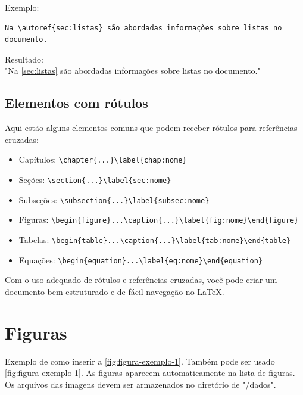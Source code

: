 Exemplo:
\begin{verbatim}
Na \autoref{sec:listas} são abordadas informações sobre listas no documento.
\end{verbatim}

Resultado: \\
"Na \autoref{sec:listas} são abordadas informações sobre listas no documento."

\subsection{Elementos com rótulos}
Aqui estão alguns elementos comuns que podem receber rótulos para referências cruzadas:

\begin{itemize}
\item Capítulos: \texttt{\textbackslash chapter\{...\}\textbackslash label\{chap:nome\}}
\item Seções: \texttt{\textbackslash section\{...\}\textbackslash label\{sec:nome\}}
\item Subseções: \texttt{\textbackslash subsection\{...\}\textbackslash label\{subsec:nome\}}
\item Figuras: \texttt{\textbackslash begin\{figure\}...\textbackslash caption\{...\}\textbackslash label\{fig:nome\}\textbackslash end\{figure\}}
\item Tabelas: \texttt{\textbackslash begin\{table\}...\textbackslash caption\{...\}\textbackslash label\{tab:nome\}\textbackslash end\{table\}}
\item Equações: \texttt{\textbackslash begin\{equation\}...\textbackslash label\{eq:nome\}\textbackslash end\{equation\}}
\end{itemize}
\vspace{0.5cm}
Com o uso adequado de rótulos e referências cruzadas, você pode criar um documento bem estruturado e de fácil navegação no \LaTeX{}. 



\section{Figuras}
\label{sec:figuras}

Exemplo de como inserir a \autoref{fig:figura-exemplo-1}. Também pode ser usado \cref{fig:figura-exemplo-1}. As figuras aparecem automaticamente na lista de figuras. Os arquivos das imagens devem ser armazenados no diretório de "/dados".

